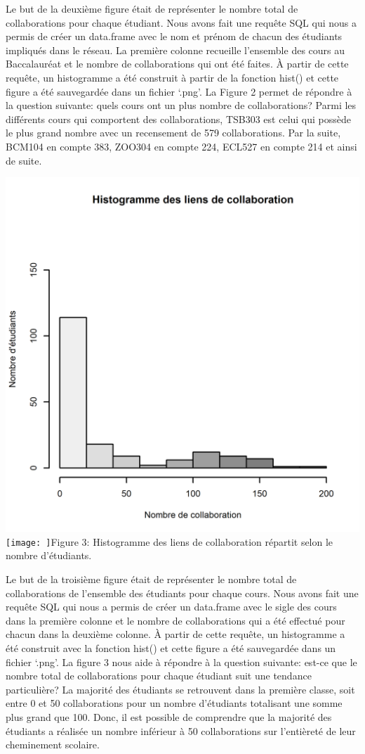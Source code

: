 \documentclass[
]{article}
\begin{document}
Le but de la deuxième figure était de représenter le nombre total de
collaborations pour chaque étudiant. Nous avons fait une requête SQL qui
nous a permis de créer un data.frame avec le nom et prénom de chacun des
étudiants impliqués dans le réseau. La première colonne recueille
l'ensemble des cours au Baccalauréat et le nombre de collaborations qui
ont été faites. À partir de cette requête, un histogramme a été
construit à partir de la fonction hist() et cette figure a été
sauvegardée dans un fichier `.png'. La Figure 2 permet de répondre à la
question suivante: quels cours ont un plus nombre de collaborations?
Parmi les différents cours qui comportent des collaborations, TSB303 est
celui qui possède le plus grand nombre avec un recensement de 579
collaborations. Par la suite, BCM104 en compte 383, ZOO304 en compte
224, ECL527 en compte 214 et ainsi de suite.

\includegraphics{images/Histogramme_de_collaboration_entre_etudiants.png}\texttt{[image: ]}Figure
3: Histogramme des liens de collaboration répartit selon le nombre
d'étudiants.

Le but de la troisième figure était de représenter le nombre total de
collaborations de l'ensemble des étudiants pour chaque cours. Nous avons
fait une requête SQL qui nous a permis de créer un data.frame avec le
sigle des cours dans la première colonne et le nombre de collaborations
qui a été effectué pour chacun dans la deuxième colonne. À partir de
cette requête, un histogramme a été construit avec la fonction hist() et
cette figure a été sauvegardée dans un fichier `.png'. La figure 3 nous
aide à répondre à la question suivante: est-ce que le nombre total de
collaborations pour chaque étudiant suit une tendance particulière? La
majorité des étudiants se retrouvent dans la première classe, soit entre
0 et 50 collaborations pour un nombre d'étudiants totalisant une somme
plus grand que 100. Donc, il est possible de comprendre que la majorité
des étudiants a réalisée un nombre inférieur à 50 collaborations sur
l'entièreté de leur cheminement scolaire.
\end{document}
